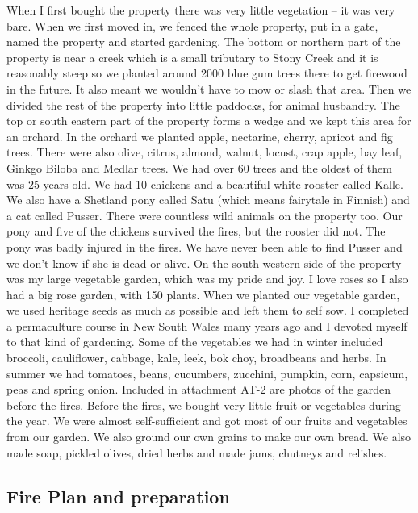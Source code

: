 \documentclass[a4paper]{article}
\begin{document}
        When I first bought the property there was very little vegetation – it was very bare. When we first moved in, we fenced the whole property, put in a gate, named the property and started gardening.
        The bottom or northern part of the property is near a creek which is a small tributary to Stony Creek and it is reasonably steep so we planted around 2000 blue gum trees there to get firewood in the future. It also meant we wouldn't have to mow or slash that area. Then we divided the rest of the property into little paddocks, for animal husbandry. The top or south eastern part of the property forms a wedge and we kept this area for an orchard. In the orchard we planted apple, nectarine, cherry, apricot and fig trees. There were also olive, citrus, almond, walnut, locust, crap apple, bay leaf, Ginkgo Biloba and Medlar trees. We had over 60 trees and the oldest of them was 25 years old.
        We had 10 chickens and a beautiful white rooster called Kalle. We also have a Shetland pony called Satu (which means fairytale in Finnish) and a cat called Pusser. There were countless wild animals on the property too. Our pony and five of the chickens survived the fires, but the rooster did not. The pony was badly injured in the fires. We have never been able to find Pusser and we don't know if she is dead or alive.
        On the south western side of the property was my large vegetable garden, which was my pride and joy. I love roses so I also had a big rose garden, with 150 plants. When we planted our vegetable garden, we used heritage seeds as much as possible and left them to self sow. I completed a permaculture course in New South Wales many years ago and I devoted myself to that kind of gardening. Some of the vegetables we had in winter included broccoli, cauliflower, cabbage, kale, leek, bok choy, broadbeans and herbs. In summer we had tomatoes, beans, cucumbers, zucchini, pumpkin, corn, capsicum, peas and spring onion. Included in attachment AT-2 are photos of the garden before the fires.
        Before the fires, we bought very little fruit or vegetables during the year. We were almost self-sufficient and got most of our fruits and vegetables from our garden. We also ground our own grains to make our own bread. We also made soap, pickled olives, dried herbs and made jams, chutneys and relishes.

    \subsection{Fire Plan and preparation}
\end{document}
